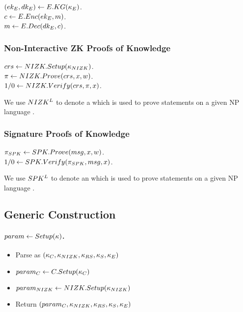 \begin{description}
\item[$(ek_{E},dk_{E}) \gets E.KG(\kappa_{E})$.]
\item[$c \gets E.Enc(ek_{E},m)$.]
\item[$m \gets E.Dec(dk_{E},c)$.]
\end{description}

\subsubsection{Non-Interactive ZK Proofs of Knowledge}


\begin{description}
\item[$crs\gets NIZK.Setup(\kappa_{NIZK})$.]
\item[$\pi \gets NIZK.Prove(crs,x,w)$.]
\item[$1/0 \gets NIZK.Verify(crs,\pi,x)$.]
\end{description}

We use $NIZK^L$ to denote a \NIZK which is used to prove statements on a
given NP language \Lang.

\subsubsection{Signature Proofs of Knowledge}


\begin{description}
\item[$\pi_{SPK} \gets SPK.Prove(msg,x,w)$.]
\item[$1/0 \gets SPK.Verify(\pi_{SPK},msg,x)$.]
\end{description}

We use $SPK^L$ to denote an \SPK which is used to prove statements on a
given NP language \Lang.

\subsection{Generic Construction \CUASGen}


\paragraph{$param \gets Setup(\kappa)$.} %
\begin{itemize}
  \item Parse \secpar as $(\kappa_{C},\kappa_{NIZK},\kappa_{RS},\kappa_{S},\kappa_{E})$
  \item $param_C \gets C.Setup(\kappa_{C})$
  \item $param_{NIZK} \gets NIZK.Setup(\kappa_{NIZK})$
  \item Return $(param_C,\kappa_{NIZK},\kappa_{RS},\kappa_{S},\kappa_{E})$
\end{itemize}

